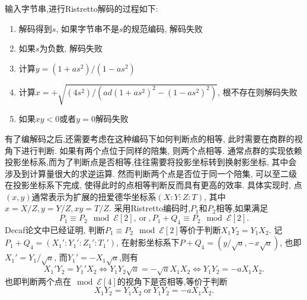 \documentclass{article}
\newcommand{\E}{\mathcal{E}}
\begin{document}
输入字节串,进行Ristretto解码的过程如下:
\begin{enumerate}
\item 解码得到$s$, 如果字节串不是$s$的规范编码, 解码失败
\item 如果$s$为负数, 解码失败
\item 计算$y = (1+as^2) / (1-as^2)$
\item 计算$x = +\sqrt{(4s^2) / \left(ad(1+as^2)^2 - (1-as^2)^2\right)}$, 根不存在则解码失败
\item 如果$xy < 0$或者$y = 0$解码失败
\end{enumerate}

有了编解码之后,还需要考虑在这种编码下如何判断点的相等, 此时需要在商群的视角下进行判断.
如果有两个点位于同样的陪集, 则两个点相等. 
通常点群的实现依赖投影坐标系,而为了判断点是否相等,往往需要将投影坐标转到换射影坐标,
其中会涉及到计算量很大的求逆运算. 然而判断两个点是否位于同一个陪集,
可以至二级在投影坐标系下完成, 使得此时的点相等判断反而具有更高的效率.
具体实现时, 点$(x,y)$通常表示为扩展的扭爱德华坐标系$(X:Y:Z:T)$,
其中$x = X/Z, y = Y/Z, xy = T/Z$.
采用Ristretto编码时,$P_1$和$P_2$相等,如果满足
$$
P_1 \equiv P_2 \mod \E[2],~\text{or}~, P_1 + Q_4 \equiv P_2 \mod \E[2].
$$
Decaf论文中已经证明, 判断$P_1 \equiv P_2 \mod \E[2]$等价于判断$X_1Y_2= Y_1X_2$.
记$P_1 + Q_4 = (X_1' : Y_1' :  Z_1' : T_1')$, 在射影坐标系下$P + Q_4 = (y/\sqrt{a}, -x\sqrt{a})$,
也即$X_1' = Y_1 / \sqrt{a}$, 而$Y_1' = -X_1\sqrt{a}$,则有
$$X_1'Y_2 = Y_1'X_2 \iff Y_1Y_2\sqrt{a} = -\sqrt{a}X_1X_2 \iff Y_1Y_2 = -aX_1X_2.$$
也即判断两个点在$\mod \E[4]$的视角下是否相等,等价于判断
$$X_1Y_2 = Y_1X_2~\text{or}~Y_1Y_2 = -aX_1X_2.$$
\end{document}
